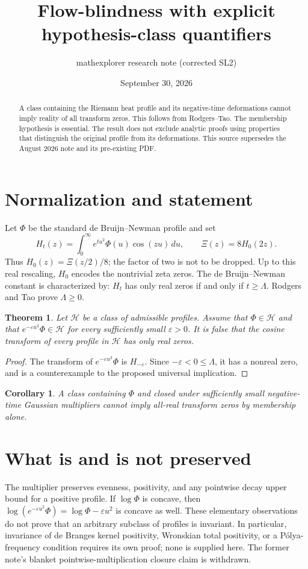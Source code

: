 \documentclass[11pt]{article}
\title{Flow-blindness with explicit hypothesis-class quantifiers}
\author{mathexplorer research note (corrected SL2)}
\date{September 30, 2026}
\newtheorem{theorem}{Theorem}
\newtheorem{corollary}{Corollary}
\begin{document}
\maketitle

\begin{abstract}
A class containing the Riemann heat profile and its negative-time deformations
cannot imply reality of all transform zeros. This follows from Rodgers--Tao.
The membership hypothesis is essential. The result does not exclude analytic
proofs using properties that distinguish the original profile from its deformations.
This source supersedes the August 2026 note and its pre-existing PDF.
\end{abstract}

\section{Normalization and statement}
Let $\Phi$ be the standard de Bruijn--Newman profile and set
\[
 H_t(z)=\int_0^\infty e^{tu^2}\Phi(u)\cos(zu)\,du,\qquad
 \Xi(z)=8H_0(2z).
\]
Thus $H_0(z)=\Xi(z/2)/8$; the factor of two is not to be dropped.
Up to this real rescaling, $H_0$ encodes the nontrivial zeta zeros.
The de Bruijn--Newman constant is characterized by: $H_t$ has only real
zeros if and only if $t\geq\Lambda$. Rodgers and Tao prove $\Lambda\geq0$.

\begin{theorem}
Let $\mathcal H$ be a class of admissible profiles. Assume that $\Phi\in\mathcal H$
and that $e^{-\varepsilon u^2}\Phi\in\mathcal H$ for every sufficiently small
$\varepsilon>0$. It is false that the cosine transform of every profile in
$\mathcal H$ has only real zeros.
\end{theorem}
\begin{proof}
The transform of $e^{-\varepsilon u^2}\Phi$ is $H_{-\varepsilon}$.
Since $-\varepsilon<0\leq\Lambda$, it has a nonreal zero, and is a counterexample
to the proposed universal implication.
\end{proof}

\begin{corollary}
A class containing $\Phi$ and closed under sufficiently small negative-time
Gaussian multipliers cannot imply all-real transform zeros by membership alone.
\end{corollary}

\section{What is and is not preserved}
The multiplier preserves evenness, positivity, and any pointwise decay upper bound
for a positive profile. If $\log\Phi$ is concave, then
$\log(e^{-\varepsilon u^2}\Phi)=\log\Phi-\varepsilon u^2$ is concave as well.
These elementary observations do not prove that an arbitrary subclass
of profiles is invariant. In particular, invariance of de Branges kernel
positivity, Wronskian total positivity, or a P\'olya-frequency condition
requires its own proof; none is supplied here. The former note's blanket
pointwise-multiplication closure claim is withdrawn.
\end{document}
